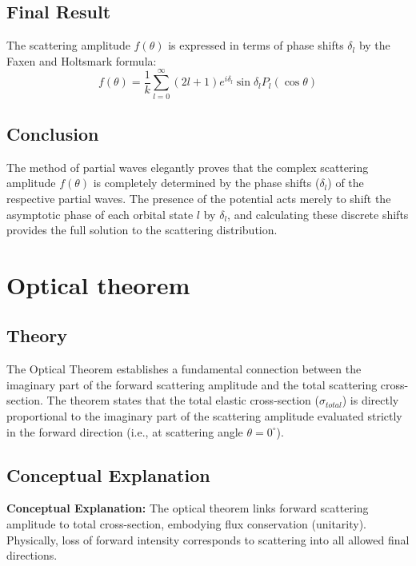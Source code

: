 \documentclass[12pt]{report}
\begin{document}
\subsection*{Final Result}
The scattering amplitude $f(\theta)$ is expressed in terms of phase shifts $\delta_l$ by the Faxen and Holtsmark formula:
\begin{equation}
\boxed{ f(\theta) = \frac{1}{k} \sum_{l=0}^{\infty} (2l+1) e^{i\delta_l} \sin \delta_l P_l(\cos \theta) }
\end{equation}

\subsection*{Conclusion}
The method of partial waves elegantly proves that the complex scattering amplitude $f(\theta)$ is completely determined by the phase shifts ($\delta_l$) of the respective partial waves. The presence of the potential acts merely to shift the asymptotic phase of each orbital state $l$ by $\delta_l$, and calculating these discrete shifts provides the full solution to the scattering distribution.

\section{Optical theorem}



\subsection*{Theory}
The Optical Theorem establishes a fundamental connection between the imaginary part of the forward scattering amplitude and the total scattering cross-section. The theorem states that the total elastic cross-section ($\sigma_{total}$) is directly proportional to the imaginary part of the scattering amplitude evaluated strictly in the forward direction (i.e., at scattering angle $\theta = 0^\circ$).


\subsection{Conceptual Explanation}
\textbf{Conceptual Explanation:} The optical theorem links forward scattering amplitude to total cross-section, embodying flux conservation (unitarity). Physically, loss of forward intensity corresponds to scattering into all allowed final directions.
\end{document}
